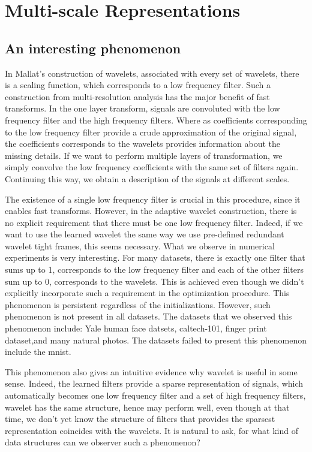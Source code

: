 \documentclass[a4paper]{article}
\begin{document}
\section{Multi-scale Representations}
\subsection{An interesting phenomenon}
In Mallat's construction of wavelets, associated with every set of wavelets, there is a scaling function, which corresponds to a low frequency filter. Such a construction from multi-resolution analysis has the major benefit of fast transforms. In the one layer transform, signals are convoluted with the low frequency filter and the high frequency filters. Where as coefficients corresponding to the low frequency filter provide a crude approximation of the original signal, the coefficients corresponds to the wavelets provides information about the missing details. If we want to perform multiple layers of transformation, we simply convolve the low frequency coefficients with the same set of filters again. Continuing this way, we obtain a description of the signals at different scales. 

The existence of a single low frequency filter is crucial in this procedure, since it enables fast transforms. However, in the adaptive wavelet construction, there is no explicit requirement that there must be one low frequency filter. Indeed, if we want to use the learned wavelet the same way we use pre-defined redundant wavelet tight frames, this seems necessary. What we observe in numerical experiments is very interesting. For many datasets, there is exactly one filter that sums up to 1, corresponds to the low frequency filter and each of the other filters sum up to 0, corresponds to the wavelets. This is achieved even though we didn't explicitly incorporate such a requirement in the optimization procedure. This phenomenon is persistent regardless of the initializations. However, such phenomenon is not present in all datasets. The datasets that we observed this phenomenon include: Yale human face datsets, caltech-101, finger print dataset,and many natural photos. The datasets failed to present this phenomenon include the mnist.  

This phenomenon also gives an intuitive evidence why wavelet is useful in some sense. Indeed, the learned filters provide a sparse representation of signals, which automatically becomes one low frequency filter and a set of high frequency filters, wavelet has the same structure, hence may perform well, even though at that time, we don't yet know the structure of  filters that provides the sparsest representation coincides with the wavelets. It is natural to ask, for what kind of data structures can we observer such a phenomenon?
\end{document}
